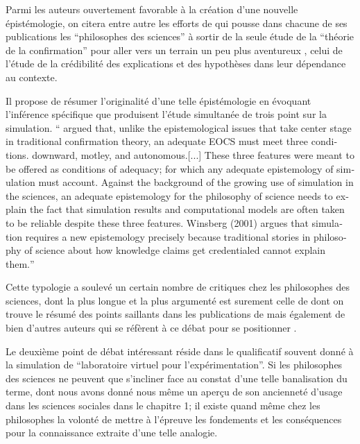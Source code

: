 Parmi les auteurs ouvertement favorable à la création d'une nouvelle épistémologie, on citera entre autre les efforts de \autocites{Winsberg2001, Winsberg2009, Winsberg2013} qui pousse dans chacune de ses publications les \enquote{philosophes des sciences} à sortir de la seule étude de la \enquote{théorie de la confirmation} pour aller vers un terrain un peu plus aventureux , celui de l'étude de la crédibilité des explications et des hypothèses dans leur dépendance au contexte.

Il propose de résumer l'originalité d'une telle épistémologie en évoquant l'inférence spécifique que produisent l'étude simultanée de trois point sur la simulation. \foreignquote{english}{ \textcite{Winsberg2001} argued that, unlike the epistemological issues that take center stage in traditional confirmation theory, an adequate EOCS must meet three conditions. 
downward, motley, and autonomous.[...] These three features were meant to be offered as conditions of adequacy; for which any adequate epistemology of simulation must account. Against the background of the growing use of simulation in the sciences, an adequate epistemology for the philosophy of science needs to explain the fact that simulation results and computational models are often taken to be reliable despite these three features. Winsberg (2001) argues that simulation requires a new epistemology precisely because traditional stories in philosophy of science about how knowledge claims get credentialed cannot explain them.}

Cette typologie a soulevé un certain nombre de critiques chez les philosophes des sciences, dont la plus longue et la plus argumenté est surement celle de \textcite{Frigg2009} dont on trouve le résumé des points saillants dans les publications de \textcites{Winsberg2009, Winsberg2013} mais également de bien d'autres auteurs qui se réfèrent à ce débat pour se positionner \textcites{Yanoff2010, Eckhart2010}.

Le deuxième point de débat intéressant réside dans le qualificatif souvent donné à la simulation de \enquote{laboratoire virtuel pour l'expérimentation}. Si les philosophes des sciences ne peuvent que s'incliner face au constat d'une telle banalisation du terme, dont nous avons donné nous même un aperçu de son ancienneté d'usage dans les sciences sociales dans le chapitre 1; il existe quand même chez les philosophes la volonté de mettre à l'épreuve les fondements et les conséquences pour la connaissance extraite d'une telle analogie.

